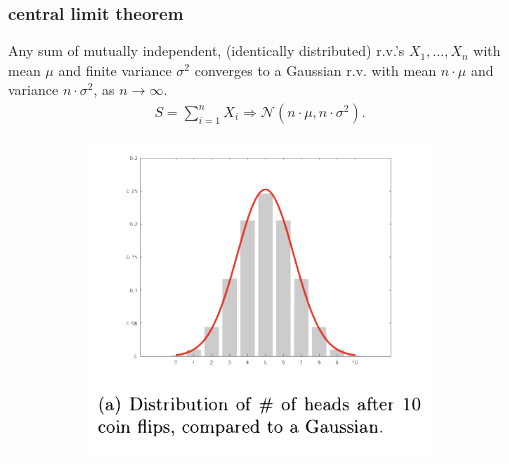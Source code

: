 \documentclass[compress]{beamer}
\begin{document}
\begin{frame}
	\frametitle{central limit theorem}
	\begin{theorem}
		Any sum of \alert{mutually independent}, \alert{(identically distributed)}  r.v.'s $X_1,  \ldots, X_n$ with mean $\mu$ and finite variance $\sigma^2$ converges to a Gaussian r.v. with mean $n\cdot\mu$ and variance $n\cdot\sigma^2$, as $n\rightarrow \infty$.
		\vspace{-.5em}
		\begin{align*}
			S = \sum_{i=1}^n X_i \Longrightarrow \mathcal{N}(n\cdot\mu, n\cdot\sigma^2).
		\end{align*}	
		\vspace{-.5em}	
	\end{theorem}
	\vspace{-.5em}	
	\begin{figure}
		\begin{subfigure}[t]{0.4\textwidth}
			\centering
			\includegraphics[width=\textwidth]{cltWide.png}
		\end{subfigure}
		\hspace{4em}
		\begin{subfigure}[t]{0.4\textwidth}
			\centering

\end{subfigure}
\end{figure}
\end{frame}
\end{document}
